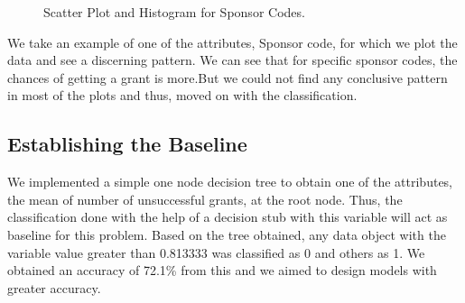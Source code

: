 \documentclass{article} %
\begin{document}
	\begin{figure}[h]
		\begin{center}
		\end{center}
		\caption{Scatter Plot and Histogram for Sponsor Codes.}
		\label{fig:sponsor}
	\end{figure}
	
	We take an example of one of the attributes, Sponsor code, for which we plot the data and see a discerning pattern. We can see that for specific sponsor codes, the chances of getting a grant is more.But we could not find any conclusive pattern in most of the plots and thus, moved on with the classification.  
	
	\subsection{Establishing the Baseline}
	We implemented a simple one node decision tree to obtain one of the attributes, the mean of number of unsuccessful grants, at the root node. Thus, the classification done with the help of a decision stub with this variable will act as baseline for this problem. Based on the tree obtained, any data object with the variable value greater than 0.813333 was classified as 0 and others as 1. We obtained an accuracy of 72.1\% from this and we aimed to design models with greater accuracy.
	
\end{document}

